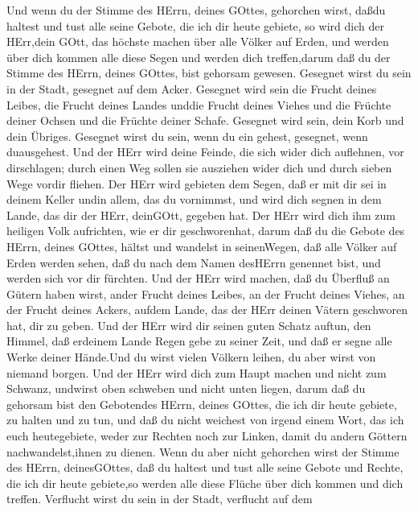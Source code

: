  Und wenn du der Stimme des HErrn, deines GOttes, gehorchen
wirst, daßdu haltest und tust alle seine Gebote, die ich dir heute
gebiete, so wird dich der HErr,dein GOtt, das höchste machen über alle
Völker auf Erden,  und werden über dich kommen alle diese
Segen und werden dich treffen,darum daß du der Stimme des HErrn, deines
GOttes, bist gehorsam gewesen.  Gesegnet wirst du sein in
der Stadt, gesegnet auf dem Acker.  Gesegnet wird sein die
Frucht deines Leibes, die Frucht deines Landes unddie Frucht deines
Viehes und die Früchte deiner Ochsen und die Früchte deiner Schafe.
 Gesegnet wird sein, dein Korb und dein Übriges.
 Gesegnet wirst du sein, wenn du ein gehest, gesegnet, wenn
duausgehest.  Und der HErr wird deine Feinde, die sich wider
dich auflehnen, vor dirschlagen; durch einen Weg sollen sie ausziehen
wider dich und durch sieben Wege vordir fliehen.  Der HErr
wird gebieten dem Segen, daß er mit dir sei in deinem Keller undin
allem, das du vornimmst, und wird dich segnen in dem Lande, das dir der
HErr, deinGOtt, gegeben hat.  Der HErr wird dich ihm zum
heiligen Volk aufrichten, wie er dir geschworenhat, darum daß du die
Gebote des HErrn, deines GOttes, hältst und wandelst in seinenWegen,
 daß alle Völker auf Erden werden sehen, daß du nach dem
Namen desHErrn genennet bist, und werden sich vor dir fürchten.
 Und der HErr wird machen, daß du Überfluß an Gütern haben
wirst, ander Frucht deines Leibes, an der Frucht deines Viehes, an der
Frucht deines Ackers, aufdem Lande, das der HErr deinen Vätern
geschworen hat, dir zu geben.  Und der HErr wird dir seinen
guten Schatz auftun, den Himmel, daß erdeinem Lande Regen gebe zu seiner
Zeit, und daß er segne alle Werke deiner Hände.Und du wirst vielen
Völkern leihen, du aber wirst von niemand borgen.  Und der
HErr wird dich zum Haupt machen und nicht zum Schwanz, undwirst oben
schweben und nicht unten liegen, darum daß du gehorsam bist den
Gebotendes HErrn, deines GOttes, die ich dir heute gebiete, zu halten
und zu tun,  und daß du nicht weichest von irgend einem
Wort, das ich euch heutegebiete, weder zur Rechten noch zur Linken,
damit du andern Göttern nachwandelst,ihnen zu dienen.  Wenn
du aber nicht gehorchen wirst der Stimme des HErrn, deinesGOttes, daß du
haltest und tust alle seine Gebote und Rechte, die ich dir heute
gebiete,so werden alle diese Flüche über dich kommen und dich treffen.
 Verflucht wirst du sein in der Stadt, verflucht auf dem

